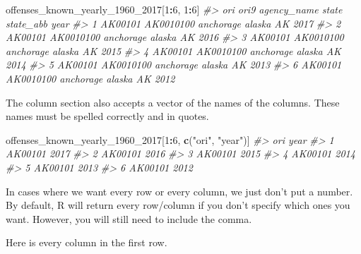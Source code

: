 \documentclass[
  12pt,
]{book}
\newenvironment{Shaded}{\begin{snugshade}}{\end{snugshade}}
\newcommand{\CommentTok}[1]{\textcolor[rgb]{0.37,0.37,0.37}{\textit{#1}}}
\newcommand{\DecValTok}[1]{\textcolor[rgb]{0.06,0.06,0.06}{#1}}
\newcommand{\KeywordTok}[1]{\textcolor[rgb]{0.27,0.27,0.27}{\textbf{#1}}}
\newcommand{\NormalTok}[1]{#1}
\newcommand{\OperatorTok}[1]{\textcolor[rgb]{0.43,0.43,0.43}{\textbf{#1}}}
\newcommand{\StringTok}[1]{\textcolor[rgb]{0.5,0.5,0.5}{#1}}
\begin{document}
\begin{Shaded}
\begin{Highlighting}[]
\NormalTok{offenses\_known\_yearly\_}\DecValTok{1960}\NormalTok{\_}\DecValTok{2017}\NormalTok{[}\DecValTok{1}\OperatorTok{:}\DecValTok{6}\NormalTok{, }\DecValTok{1}\OperatorTok{:}\DecValTok{6}\NormalTok{]}
\CommentTok{\#\textgreater{}       ori      ori9 agency\_name  state state\_abb year}
\CommentTok{\#\textgreater{} 1 AK00101 AK0010100   anchorage alaska        AK 2017}
\CommentTok{\#\textgreater{} 2 AK00101 AK0010100   anchorage alaska        AK 2016}
\CommentTok{\#\textgreater{} 3 AK00101 AK0010100   anchorage alaska        AK 2015}
\CommentTok{\#\textgreater{} 4 AK00101 AK0010100   anchorage alaska        AK 2014}
\CommentTok{\#\textgreater{} 5 AK00101 AK0010100   anchorage alaska        AK 2013}
\CommentTok{\#\textgreater{} 6 AK00101 AK0010100   anchorage alaska        AK 2012}
\end{Highlighting}
\end{Shaded}

The column section also accepts a vector of the names of the columns. These names must be spelled correctly and in quotes.

\begin{Shaded}
\begin{Highlighting}[]
\NormalTok{offenses\_known\_yearly\_}\DecValTok{1960}\NormalTok{\_}\DecValTok{2017}\NormalTok{[}\DecValTok{1}\OperatorTok{:}\DecValTok{6}\NormalTok{, }\KeywordTok{c}\NormalTok{(}\StringTok{"ori"}\NormalTok{, }\StringTok{"year"}\NormalTok{)]}
\CommentTok{\#\textgreater{}       ori year}
\CommentTok{\#\textgreater{} 1 AK00101 2017}
\CommentTok{\#\textgreater{} 2 AK00101 2016}
\CommentTok{\#\textgreater{} 3 AK00101 2015}
\CommentTok{\#\textgreater{} 4 AK00101 2014}
\CommentTok{\#\textgreater{} 5 AK00101 2013}
\CommentTok{\#\textgreater{} 6 AK00101 2012}
\end{Highlighting}
\end{Shaded}

In cases where we want every row or every column, we just don't put a number. By default, R will return every row/column if you don't specify which ones you want. However, you will still need to include the comma.

Here is every column in the first row.
\end{document}
